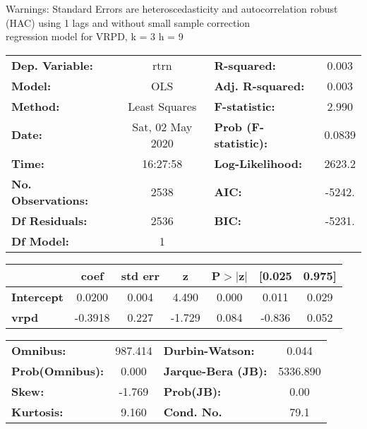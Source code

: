 Warnings: \newline
 [1] Standard Errors are heteroscedasticity and autocorrelation robust (HAC) using 1 lags and without small sample correction\\ 

regression model for VRPD, k = 3 h = 9\begin{center}
\begin{tabular}{lclc}
\toprule
\textbf{Dep. Variable:}    &       rtrn       & \textbf{  R-squared:         } &     0.003   \\
\textbf{Model:}            &       OLS        & \textbf{  Adj. R-squared:    } &     0.003   \\
\textbf{Method:}           &  Least Squares   & \textbf{  F-statistic:       } &     2.990   \\
\textbf{Date:}             & Sat, 02 May 2020 & \textbf{  Prob (F-statistic):} &   0.0839    \\
\textbf{Time:}             &     16:27:58     & \textbf{  Log-Likelihood:    } &    2623.2   \\
\textbf{No. Observations:} &        2538      & \textbf{  AIC:               } &    -5242.   \\
\textbf{Df Residuals:}     &        2536      & \textbf{  BIC:               } &    -5231.   \\
\textbf{Df Model:}         &           1      & \textbf{                     } &             \\
\bottomrule
\end{tabular}
\begin{tabular}{lcccccc}
                   & \textbf{coef} & \textbf{std err} & \textbf{z} & \textbf{P$> |$z$|$} & \textbf{[0.025} & \textbf{0.975]}  \\
\midrule
\textbf{Intercept} &       0.0200  &        0.004     &     4.490  &         0.000        &        0.011    &        0.029     \\
\textbf{vrpd}      &      -0.3918  &        0.227     &    -1.729  &         0.084        &       -0.836    &        0.052     \\
\bottomrule
\end{tabular}
\begin{tabular}{lclc}
\textbf{Omnibus:}       & 987.414 & \textbf{  Durbin-Watson:     } &    0.044  \\
\textbf{Prob(Omnibus):} &   0.000 & \textbf{  Jarque-Bera (JB):  } & 5336.890  \\
\textbf{Skew:}          &  -1.769 & \textbf{  Prob(JB):          } &     0.00  \\
\textbf{Kurtosis:}      &   9.160 & \textbf{  Cond. No.          } &     79.1  \\
\bottomrule
\end{tabular}
\end{center}

